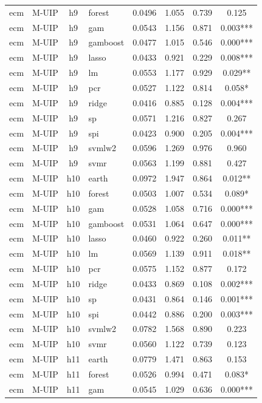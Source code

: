 \begin{ThreePartTable}
\begin{longtable}[t]{llclcccc}
ecm & M-UIP & h9 & forest & 0.0496 & 1.055 & 0.739 & 0.125\\
ecm & M-UIP & h9 & gam & 0.0543 & 1.156 & 0.871 & 0.003***\\
ecm & M-UIP & h9 & gamboost & 0.0477 & 1.015 & 0.546 & 0.000***\\
ecm & M-UIP & h9 & lasso & 0.0433 & 0.921 & 0.229 & 0.008***\\
ecm & M-UIP & h9 & lm & 0.0553 & 1.177 & 0.929 & 0.029**\\
ecm & M-UIP & h9 & pcr & 0.0527 & 1.122 & 0.814 & 0.058*\\
ecm & M-UIP & h9 & ridge & 0.0416 & 0.885 & 0.128 & 0.004***\\
ecm & M-UIP & h9 & sp & 0.0571 & 1.216 & 0.827 & 0.267\\
ecm & M-UIP & h9 & spi & 0.0423 & 0.900 & 0.205 & 0.004***\\
ecm & M-UIP & h9 & svmlw2 & 0.0596 & 1.269 & 0.976 & 0.960\\
ecm & M-UIP & h9 & svmr & 0.0563 & 1.199 & 0.881 & 0.427\\
\addlinespace
ecm & M-UIP & h10 & earth & 0.0972 & 1.947 & 0.864 & 0.012**\\
ecm & M-UIP & h10 & forest & 0.0503 & 1.007 & 0.534 & 0.089*\\
ecm & M-UIP & h10 & gam & 0.0528 & 1.058 & 0.716 & 0.000***\\
ecm & M-UIP & h10 & gamboost & 0.0531 & 1.064 & 0.647 & 0.000***\\
ecm & M-UIP & h10 & lasso & 0.0460 & 0.922 & 0.260 & 0.011**\\
ecm & M-UIP & h10 & lm & 0.0569 & 1.139 & 0.911 & 0.018**\\
ecm & M-UIP & h10 & pcr & 0.0575 & 1.152 & 0.877 & 0.172\\
ecm & M-UIP & h10 & ridge & 0.0433 & 0.869 & 0.108 & 0.002***\\
ecm & M-UIP & h10 & sp & 0.0431 & 0.864 & 0.146 & 0.001***\\
ecm & M-UIP & h10 & spi & 0.0442 & 0.886 & 0.200 & 0.003***\\
ecm & M-UIP & h10 & svmlw2 & 0.0782 & 1.568 & 0.890 & 0.223\\
ecm & M-UIP & h10 & svmr & 0.0560 & 1.122 & 0.739 & 0.123\\
\addlinespace
ecm & M-UIP & h11 & earth & 0.0779 & 1.471 & 0.863 & 0.153\\
ecm & M-UIP & h11 & forest & 0.0526 & 0.994 & 0.471 & 0.083*\\
ecm & M-UIP & h11 & gam & 0.0545 & 1.029 & 0.636 & 0.000***\\

\end{longtable}
\end{ThreePartTable}
